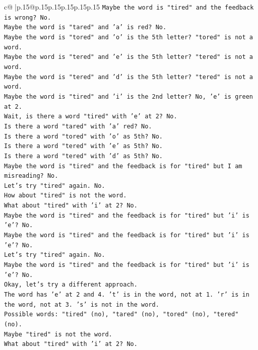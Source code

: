 \documentclass{article}
\begin{document}
{\begin{supertabular}{c@{$\;$}|p{.15\linewidth}@{}p{.15\linewidth}p{.15\linewidth}p{.15\linewidth}p{.15\linewidth}p{.15\linewidth}}
{{{\texttt{Maybe the word is "tired" and the feedback is wrong? No.} \\
\texttt{Maybe the word is "tared" and 'a' is red? No.} \\
\texttt{Maybe the word is "tored" and 'o' is the 5th letter? "tored" is not a word.} \\
\texttt{Maybe the word is "tered" and 'e' is the 5th letter? "tered" is not a word.} \\
\texttt{Maybe the word is "tered" and 'd' is the 5th letter? "tered" is not a word.} \\
\texttt{Maybe the word is "tired" and 'i' is the 2nd letter? No, 'e' is green at 2.} \\
\texttt{Wait, is there a word "tired" with 'e' at 2? No.} \\
\texttt{Is there a word "tared" with 'a' red? No.} \\
\texttt{Is there a word "tored" with 'o' as 5th? No.} \\
\texttt{Is there a word "tered" with 'e' as 5th? No.} \\
\texttt{Is there a word "tered" with 'd' as 5th? No.} \\
\texttt{Maybe the word is "tired" and the feedback is for "tired" but I am misreading? No.} \\
\texttt{Let's try "tired" again. No.} \\
\texttt{How about "tired" is not the word.} \\
\texttt{What about "tired" with 'i' at 2? No.} \\
\texttt{Maybe the word is "tired" and the feedback is for "tired" but 'i' is 'e'? No.} \\
\texttt{Maybe the word is "tired" and the feedback is for "tired" but 'i' is 'e'? No.} \\
\texttt{Let's try "tired" again. No.} \\
\texttt{Maybe the word is "tired" and the feedback is for "tired" but 'i' is 'e'? No.} \\
\texttt{Okay, let's try a different approach.} \\
\texttt{The word has 'e' at 2 and 4. 't' is in the word, not at 1. 'r' is in the word, not at 3. 's' is not in the word.} \\
\texttt{Possible words: "tired" (no), "tared" (no), "tored" (no), "tered" (no).} \\
\texttt{Maybe "tired" is not the word.} \\
\texttt{What about "tired" with 'i' at 2? No.} \\
}}}
\end{supertabular}}
\end{document}
